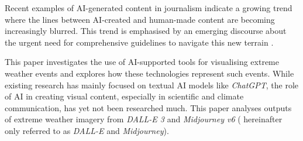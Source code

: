 Recent examples of AI-generated content in journalism \parencite{Henrich2023, Kim2023} indicate a growing trend where the lines between AI-created and human-made content are becoming increasingly blurred. This trend is emphasised by an emerging discourse about the urgent need for comprehensive guidelines to navigate this new terrain \parencite{CouncilOfEurope2023, SwissPressCouncil2023}. 

This paper investigates the use of AI-supported tools for visualising extreme weather events and explores how these technologies represent such events. While existing research has mainly focused on textual AI models like \textit{ChatGPT}, the role of AI in creating visual content, especially in scientific and climate communication, has yet not been researched much. This paper analyses outputs of extreme weather imagery from \textit{DALL-E 3} and \textit{Midjourney v6} ( hereinafter only referred to as \textit{DALL-E} and \textit{Midjourney}).
